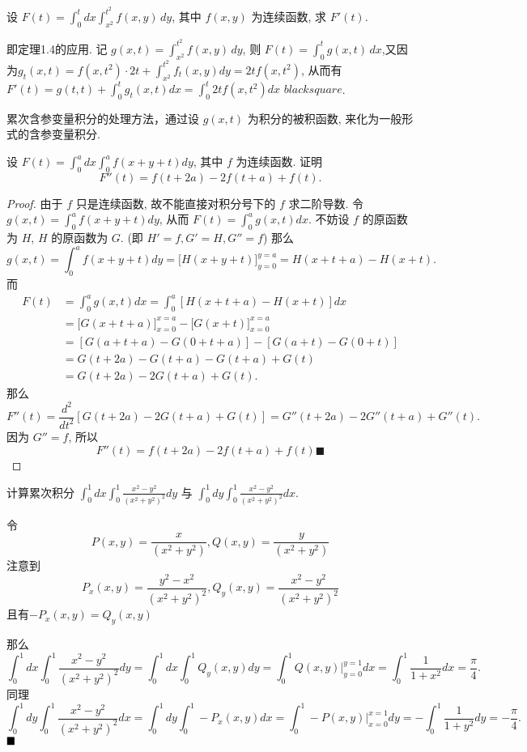 \documentclass[lang=cn,newtx,10pt,scheme=chinese]{elegantbook}
\begin{document}
\begin{example}
设 $F(t) = \int_{0}^{t} dx \int_{x^2}^{t^2} f(x,y) \,dy$, 其中 $f(x,y)$ 为连续函数, 求 $F'(t)$.
\end{example}

\begin{solution}
即定理1.4的应用.
记 $g(x,t) = \int_{x^2}^{t^2} f(x,y) \,dy$, 则 $F(t) = \int_{0}^{t} g(x,t) \,dx$,又因为$g_t(x,t) = f(x,t^2)\cdot 2t + \int_{x^2}^{t^2} f_t(x,y)dy = 2tf(x,t^2)$,
从而有$F'(t) = g(t,t)+\int_{0}^{t}g_t(x,t)dx = \int_{0}^{t}2tf(x,t^2)dx$ $blacksquare$.
\end{solution}
\begin{note}
    累次含参变量积分的处理方法，通过设 $g(x,t)$ 为积分的被积函数, 来化为一般形式的含参变量积分.
\end{note}

\begin{example}
设 $F(t) = \int_0^a dx \int_0^a f(x+y+t) dy$, 其中 $f$ 为连续函数. 证明
$$F''(t) = f(t+2a) - 2f(t+a) + f(t).$$
\end{example}

\begin{proof}
由于 $f$ 只是连续函数, 故不能直接对积分号下的 $f$ 求二阶导数.
令 $g(x,t) = \int_0^a f(x+y+t) dy$, 从而 $F(t) = \int_0^a g(x,t) dx$.
不妨设 $f$ 的原函数为 $H$, $H$ 的原函数为 $G$. (即 $H'=f, G'=H, G''=f$)
那么
$$ g(x,t) = \int_0^a f(x+y+t) dy = \big[ H(x+y+t) \big]_{y=0}^{y=a} = H(x+t+a) - H(x+t). $$
而
\begin{align*}
F(t) &= \int_0^a g(x,t) dx = \int_0^a [H(x+t+a) - H(x+t)] dx \\
&= \big[ G(x+t+a) \big]_{x=0}^{x=a} - \big[ G(x+t) \big]_{x=0}^{x=a} \\
&= [G(a+t+a) - G(0+t+a)] - [G(a+t) - G(0+t)] \\
&= G(t+2a) - G(t+a) - G(t+a) + G(t) \\
&= G(t+2a) - 2G(t+a) + G(t).
\end{align*}
那么
$$ F''(t) = \frac{d^2}{dt^2} [G(t+2a) - 2G(t+a) + G(t)] = G''(t+2a) - 2G''(t+a) + G''(t). $$
因为 $G''=f$, 所以
$$ F''(t) = f(t+2a) - 2f(t+a) + f(t) \blacksquare$$
\end{proof}

\begin{example}[$\bigstar$]
计算累次积分 $\int_0^1 dx \int_0^1 \frac{x^2 - y^2}{(x^2 + y^2)^2} dy$ 与  $\int_0^1 dy \int_0^1 \frac{x^2 - y^2}{(x^2 + y^2)^2} dx$.
\end{example}

\begin{solution}
    令$$P(x,y) = \frac{x}{(x^2 + y^2)}, Q(x,y) = \frac{y}{(x^2 + y^2)}$$ 注意到$$P_x(x,y) = \frac{y^2 - x^2}{(x^2 + y^2)^2}, Q_y(x,y) = \frac{x^2 - y^2}{(x^2 + y^2)^2}$$
    且有$-P_x(x,y) = Q_y(x,y)$

    那么
    $$
    \int_0^1 dx \int_0^1 \frac{x^2 - y^2}{(x^2 + y^2)^2} dy = \int_0^1 dx \int_0^1 Q_y(x,y) dy = \int_0^1 Q(x,y) \bigg|_{y=0}^{y=1} dx = \int_0^1 \frac{1}{1+x^2} dx = \frac{\pi}{4}.
    $$
    同理
    $$
    \int_0^1 dy \int_0^1 \frac{x^2 - y^2}{(x^2 + y^2)^2} dx = \int_0^1 dy \int_0^1 -P_x(x,y) dx = \int_0^1 -P(x,y) \bigg|_{x=0}^{x=1} dy = -\int_0^1 \frac{1}{1+y^2} dy = -\frac{\pi}{4}.
    $$
    $\hfill \blacksquare$
\end{solution}
\end{document}
